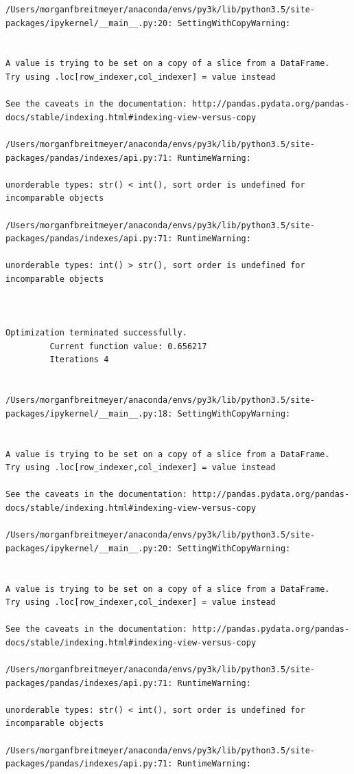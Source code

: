 \begin{lstlisting}
/Users/morganfbreitmeyer/anaconda/envs/py3k/lib/python3.5/site-packages/ipykernel/__main__.py:20: SettingWithCopyWarning:


A value is trying to be set on a copy of a slice from a DataFrame.
Try using .loc[row_indexer,col_indexer] = value instead

See the caveats in the documentation: http://pandas.pydata.org/pandas-docs/stable/indexing.html#indexing-view-versus-copy

/Users/morganfbreitmeyer/anaconda/envs/py3k/lib/python3.5/site-packages/pandas/indexes/api.py:71: RuntimeWarning:

unorderable types: str() < int(), sort order is undefined for incomparable objects

/Users/morganfbreitmeyer/anaconda/envs/py3k/lib/python3.5/site-packages/pandas/indexes/api.py:71: RuntimeWarning:

unorderable types: int() > str(), sort order is undefined for incomparable objects



Optimization terminated successfully.
         Current function value: 0.656217
         Iterations 4


/Users/morganfbreitmeyer/anaconda/envs/py3k/lib/python3.5/site-packages/ipykernel/__main__.py:18: SettingWithCopyWarning:


A value is trying to be set on a copy of a slice from a DataFrame.
Try using .loc[row_indexer,col_indexer] = value instead

See the caveats in the documentation: http://pandas.pydata.org/pandas-docs/stable/indexing.html#indexing-view-versus-copy

/Users/morganfbreitmeyer/anaconda/envs/py3k/lib/python3.5/site-packages/ipykernel/__main__.py:20: SettingWithCopyWarning:


A value is trying to be set on a copy of a slice from a DataFrame.
Try using .loc[row_indexer,col_indexer] = value instead

See the caveats in the documentation: http://pandas.pydata.org/pandas-docs/stable/indexing.html#indexing-view-versus-copy

/Users/morganfbreitmeyer/anaconda/envs/py3k/lib/python3.5/site-packages/pandas/indexes/api.py:71: RuntimeWarning:

unorderable types: str() < int(), sort order is undefined for incomparable objects

/Users/morganfbreitmeyer/anaconda/envs/py3k/lib/python3.5/site-packages/pandas/indexes/api.py:71: RuntimeWarning:


\end{lstlisting}
